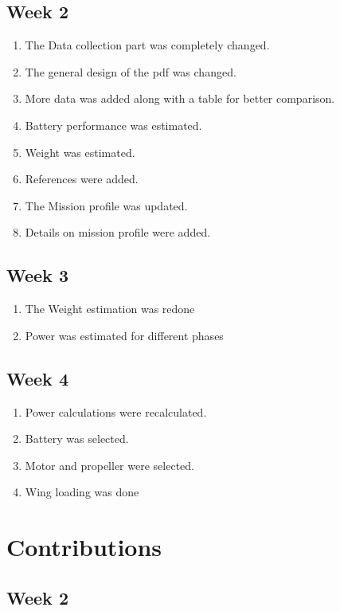\documentclass[12 pt]{article}
\begin{document}
{{\subsection{Week 2}
\begin{enumerate}
    \item The Data collection part was completely changed.
    \item The general design of the pdf was changed.
    \item More data was added along with a table for better comparison.
    \item Battery performance was estimated.
    \item Weight was estimated.
    \item References were added.
    \item The Mission profile was updated.
    \item Details on mission profile were added.
\end{enumerate}

\subsection{Week 3}
\begin{enumerate}
    \item The Weight estimation was redone
    \item Power was estimated for different phases 
\end{enumerate}

\subsection{Week 4}
\begin{enumerate}
    \item Power calculations were recalculated.
    \item Battery was selected.
    \item Motor and propeller were selected.
    \item Wing loading was done
\end{enumerate}

\newpage


\section{Contributions}

\subsection{Week 2}

}}
\end{document}
